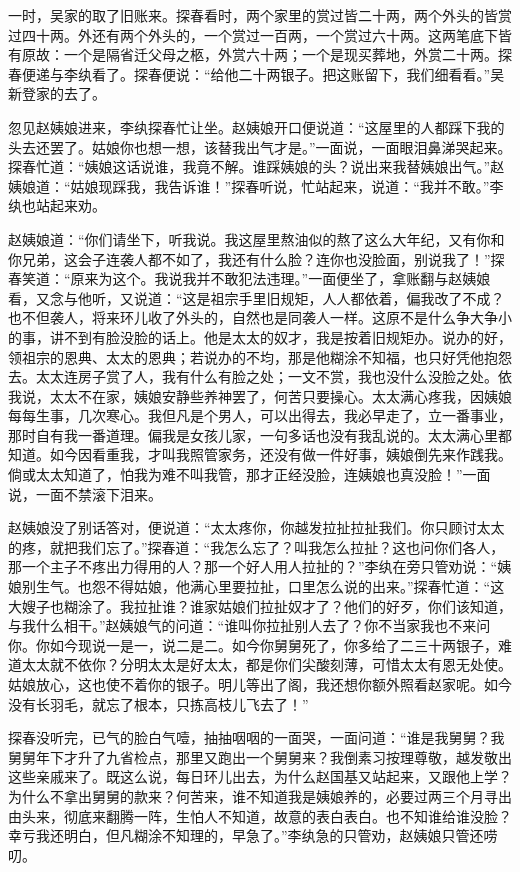 一时，吴家的取了旧账来。探春看时，两个家里的赏过皆二十两，两个外头的皆赏过四十两。外还有两个外头的，一个赏过一百两，一个赏过六十两。这两笔底下皆有原故：一个是隔省迁父母之柩，外赏六十两；一个是现买葬地，外赏二十两。探春便递与李纨看了。探春便说：“给他二十两银子。把这账留下，我们细看看。”吴新登家的去了。

忽见赵姨娘进来，李纨探春忙让坐。赵姨娘开口便说道：“这屋里的人都踩下我的头去还罢了。姑娘你也想一想，该替我出气才是。”一面说，一面眼泪鼻涕哭起来。探春忙道：“姨娘这话说谁，我竟不解。谁踩姨娘的头？说出来我替姨娘出气。”赵姨娘道：“姑娘现踩我，我告诉谁！”探春听说，忙站起来，说道：“我并不敢。”李纨也站起来劝。

赵姨娘道：“你们请坐下，听我说。我这屋里熬油似的熬了这么大年纪，又有你和你兄弟，这会子连袭人都不如了，我还有什么脸？连你也没脸面，别说我了！”探春笑道：“原来为这个。我说我并不敢犯法违理。”一面便坐了，拿账翻与赵姨娘看，又念与他听，又说道：“这是祖宗手里旧规矩，人人都依着，偏我改了不成？也不但袭人，将来环儿收了外头的，自然也是同袭人一样。这原不是什么争大争小的事，讲不到有脸没脸的话上。他是太太的奴才，我是按着旧规矩办。说办的好，领祖宗的恩典、太太的恩典；若说办的不均，那是他糊涂不知福，也只好凭他抱怨去。太太连房子赏了人，我有什么有脸之处；一文不赏，我也没什么没脸之处。依我说，太太不在家，姨娘安静些养神罢了，何苦只要操心。太太满心疼我，因姨娘每每生事，几次寒心。我但凡是个男人，可以出得去，我必早走了，立一番事业，那时自有我一番道理。偏我是女孩儿家，一句多话也没有我乱说的。太太满心里都知道。如今因看重我，才叫我照管家务，还没有做一件好事，姨娘倒先来作践我。倘或太太知道了，怕我为难不叫我管，那才正经没脸，连姨娘也真没脸！”一面说，一面不禁滚下泪来。

赵姨娘没了别话答对，便说道：“太太疼你，你越发拉扯拉扯我们。你只顾讨太太的疼，就把我们忘了。”探春道：“我怎么忘了？叫我怎么拉扯？这也问你们各人，那一个主子不疼出力得用的人？那一个好人用人拉扯的？”李纨在旁只管劝说：“姨娘别生气。也怨不得姑娘，他满心里要拉扯，口里怎么说的出来。”探春忙道：“这大嫂子也糊涂了。我拉扯谁？谁家姑娘们拉扯奴才了？他们的好歹，你们该知道，与我什么相干。”赵姨娘气的问道：“谁叫你拉扯别人去了？你不当家我也不来问你。你如今现说一是一，说二是二。如今你舅舅死了，你多给了二三十两银子，难道太太就不依你？分明太太是好太太，都是你们尖酸刻薄，可惜太太有恩无处使。姑娘放心，这也使不着你的银子。明儿等出了阁，我还想你额外照看赵家呢。如今没有长羽毛，就忘了根本，只拣高枝儿飞去了！”

探春没听完，已气的脸白气噎，抽抽咽咽的一面哭，一面问道：“谁是我舅舅？我舅舅年下才升了九省检点，那里又跑出一个舅舅来？我倒素习按理尊敬，越发敬出这些亲戚来了。既这么说，每日环儿出去，为什么赵国基又站起来，又跟他上学？为什么不拿出舅舅的款来？何苦来，谁不知道我是姨娘养的，必要过两三个月寻出由头来，彻底来翻腾一阵，生怕人不知道，故意的表白表白。也不知谁给谁没脸？幸亏我还明白，但凡糊涂不知理的，早急了。”李纨急的只管劝，赵姨娘只管还唠叨。

